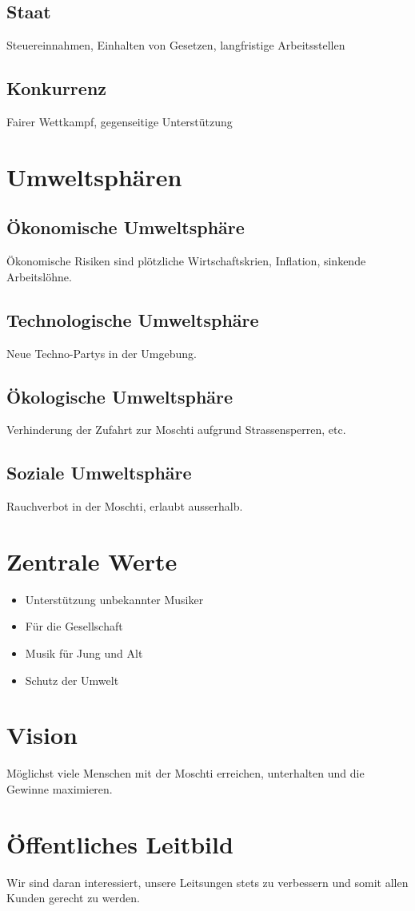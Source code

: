 \documentclass[a4paper, titlepage]{article}
\begin{document}
\subsection{Staat}
Steuereinnahmen, Einhalten von Gesetzen, langfristige Arbeitsstellen
\subsection{Konkurrenz}
Fairer Wettkampf, gegenseitige Unterstützung

\section{Umweltsphären}
\subsection{Ökonomische Umweltsphäre}
Ökonomische Risiken sind plötzliche Wirtschaftskrien, Inflation, sinkende Arbeitslöhne.
\subsection{Technologische Umweltsphäre}
Neue Techno-Partys in der Umgebung.
\subsection{Ökologische Umweltsphäre}
Verhinderung der Zufahrt zur Moschti aufgrund Strassensperren, etc.
\subsection{Soziale Umweltsphäre}
Rauchverbot in der Moschti, erlaubt ausserhalb. 
\section{Zentrale Werte}
\begin{itemize}
  \item Unterstützung unbekannter Musiker
  \item Für die Gesellschaft
  \item Musik für Jung und Alt
  \item Schutz der Umwelt
\end{itemize}
\section{Vision}
Möglichst viele Menschen mit der Moschti erreichen, unterhalten und die Gewinne maximieren. 
\section{Öffentliches Leitbild}
Wir sind daran interessiert, unsere Leitsungen stets zu verbessern und somit allen Kunden gerecht zu werden.
\end{document}

